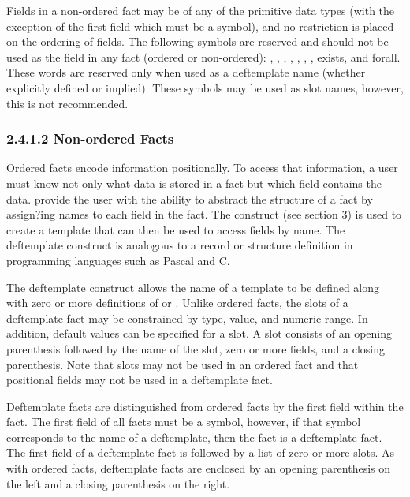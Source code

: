 \documentclass[letterpaper,10pt,english]{sphinxmanual}
\begin{document}
Fields in a non-ordered fact may be of any of the primitive data types
(with the exception of the first field which must be a symbol), and no
restriction is placed on the ordering of fields. The following symbols
are reserved and should not be used as the  field in any fact
(ordered or non-ordered): , , , , ,
, , exists, and forall. These words are reserved only
when used as a deftemplate name (whether explicitly defined or implied).
These symbols may be used as slot names, however, this is not
recommended.


\subsubsection{2.4.1.2 Non-ordered Facts}
\label{\detokenize{overview:non-ordered-facts}}
Ordered facts encode information positionally. To access that
information, a user must know not only what data is stored in a fact but
which field contains the data. 
provide the user with the ability to abstract the structure of a fact by
assign?ing names to each field in the fact. The 
construct (see section 3) is used to create a template that can then be
used to access fields by name. The deftemplate construct is analogous to
a record or structure definition in programming languages such as Pascal
and C.

The deftemplate construct allows the name of a template to be defined
along with zero or more definitions of  or .
Unlike ordered facts, the slots of a deftemplate fact may be constrained
by type, value, and numeric range. In addition, default values can be
specified for a slot. A slot consists of an opening parenthesis followed
by the name of the slot, zero or more fields, and a closing parenthesis.
Note that slots may not be used in an ordered fact and that positional
fields may not be used in a deftemplate fact.

Deftemplate facts are distinguished from ordered facts by the first
field within the fact. The first field of all facts must be a symbol,
however, if that symbol corresponds to the name of a deftemplate, then
the fact is a deftemplate fact. The first field of a deftemplate fact is
followed by a list of zero or more slots. As with ordered facts,
deftemplate facts are enclosed by an opening parenthesis on the left and
a closing parenthesis on the right.
\end{document}
